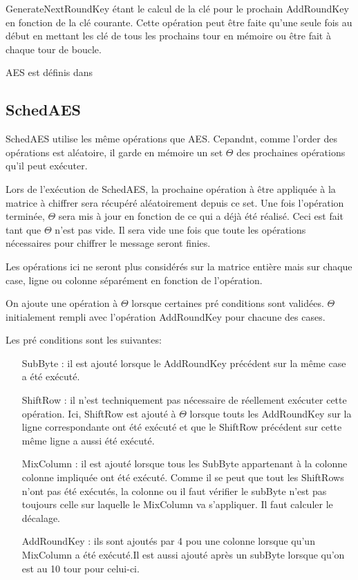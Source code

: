 \documentclass[letterpaper]{article}
\begin{document}
GenerateNextRoundKey étant le calcul de la clé pour le prochain AddRoundKey en fonction de la clé courante.
Cette opération peut être faite qu'une seule fois au début en mettant les clé de tous les prochains tour en mémoire ou être fait à chaque tour de boucle.

AES est définis dans\cite{fips197}

\subsection{SchedAES}
SchedAES utilise les même opérations que AES. Cepandnt, comme l'order des opérations est aléatoire, il garde en mémoire un set $\Theta$ des prochaines opérations qu'il peut exécuter.

Lors de l'exécution de SchedAES, la prochaine opération à être appliquée à la matrice à chiffrer sera récupéré aléatoirement depuis ce set.
Une fois l'opération terminée, $\Theta$ sera mis à jour en fonction de ce qui a déjà été réalisé.
Ceci est fait tant que $\Theta$ n'est pas vide.
Il sera vide une fois que toute les opérations nécessaires pour chiffrer le message seront finies.

Les opérations ici ne seront plus considérés sur la matrice entière mais sur chaque case, ligne ou colonne séparément en fonction de l'opération.

On ajoute une opération à $\Theta$ lorsque certaines pré conditions sont validées.
$\Theta$ initialement rempli avec l'opération AddRoundKey pour chacune des cases.

Les pré conditions sont les suivantes:
\begin{itemize}
    \item[SubByte :] il est ajouté lorsque le AddRoundKey précédent sur la même case a été exécuté.
    \item[ShiftRow :] il n'est techniquement pas nécessaire de réellement exécuter cette opération. Ici, ShiftRow est ajouté à $\Theta$ lorsque touts les AddRoundKey sur la ligne correspondante ont été exécuté et que le ShiftRow précédent sur cette même ligne a aussi été exécuté.
    \item[MixColumn :] il est ajouté lorsque tous les SubByte appartenant à la colonne colonne impliquée ont été exécuté. Comme il se peut que tout les ShiftRows n'ont pas été exécutés, la colonne ou il faut vérifier le subByte n'est pas toujours celle sur laquelle le MixColumn va s'appliquer. Il faut calculer le décalage.
    \item[AddRoundKey :] ils sont ajoutés par 4 pou une colonne lorsque qu'un MixColumn a été exécuté.Il est aussi ajouté après un subByte lorsque qu'on est au 10 tour pour celui-ci.
\end{itemize}
\end{document}
